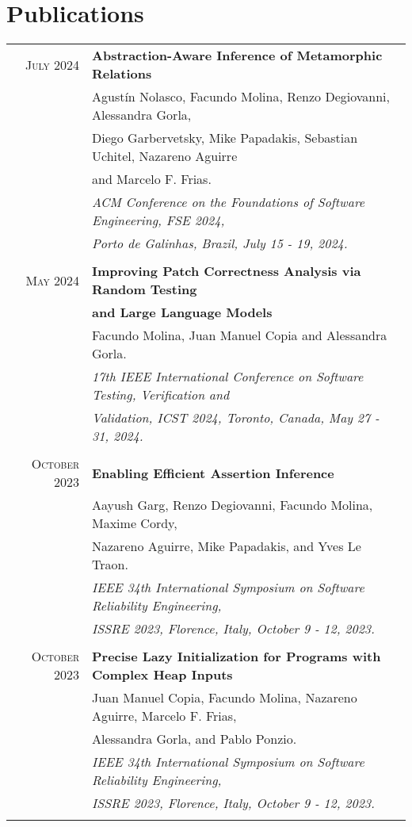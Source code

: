 \documentclass[a4paper,10pt]{article} %
\begin{document}
\section{Publications}
\begin{longtable}{rl}

\textsc{July} 2024  & \textbf{Abstraction-Aware Inference of Metamorphic Relations} \\
        & Agustín Nolasco, Facundo Molina, Renzo Degiovanni, Alessandra Gorla, \\ 
        & Diego Garbervetsky, Mike Papadakis, Sebastian Uchitel, Nazareno Aguirre \\
        & and Marcelo F. Frias. \\
        & \textit{ACM Conference on the Foundations of Software Engineering, FSE 2024,} \\
        & \textit{Porto de Galinhas, Brazil, July 15 - 19, 2024.} \\ & \\

\textsc{May} 2024  & \textbf{Improving Patch Correctness Analysis via Random Testing} \\
        & \textbf{and Large Language Models} \\
        & Facundo Molina, Juan Manuel Copia and Alessandra Gorla. \\
        & \textit{17th IEEE International Conference on Software Testing, Verification and} \\
        & \textit{Validation, ICST 2024, Toronto, Canada, May 27 - 31, 2024.} \\ & \\

\textsc{October} 2023  & \textbf{Enabling Efficient Assertion Inference} \\
        & Aayush Garg, Renzo Degiovanni, Facundo Molina, Maxime Cordy,\\
        & Nazareno Aguirre, Mike Papadakis, and Yves Le Traon. \\
        & \textit{IEEE 34th International Symposium on Software Reliability Engineering,} \\
        & \textit{ISSRE 2023, Florence, Italy, October 9 - 12, 2023.} \\ & \\

\textsc{October} 2023  & \textbf{Precise Lazy Initialization for Programs with Complex Heap Inputs} \\
        & Juan Manuel Copia, Facundo Molina, Nazareno Aguirre, Marcelo F. Frias,\\
        & Alessandra Gorla, and Pablo Ponzio. \\
        & \textit{IEEE 34th International Symposium on Software Reliability Engineering,} \\
        & \textit{ISSRE 2023, Florence, Italy, October 9 - 12, 2023.} \\ & \\


\end{longtable}
\end{document}

